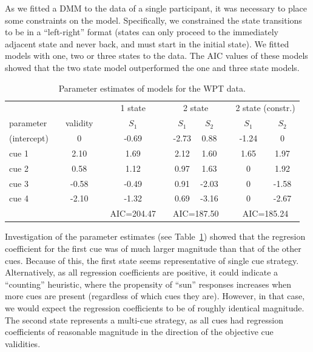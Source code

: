 \documentclass[a4paper,12pt,man]{apa} %
\begin{document}
As we fitted a DMM to the data of a single participant, it was
necessary to place some constraints on the model.  Specifically, we
constrained the state transitions to be in a ``left-right'' format
(states can only proceed to the immediately adjacent state and never
back, and must start in the initial state).  We fitted models with
one, two or three states to the data.  The AIC values of these models
showed that the two state model outperformed the one and three state
models.

\begin{table}
\caption{Parameter estimates of models for the WPT data.}
\label{tab:WPT}
\begin{tabular}{lcccccccccc} \hline
 & & \multicolumn{1}{c}{} && \multicolumn{1}{c}{1 state} & & \multicolumn{2}{c}{2 state} &&
 \multicolumn{2}{c}{2 state (constr.)} \\ \cline{5-5} \cline{7-8} \cline{10-11}
parameter && validity && $S_1$ & & $S_1$ & $S_2$ & & $S_1$ & $S_2$ \\ \hline
(intercept) && 0 && -0.69 & & -2.73 & 0.88 & & -1.24 & 0 \\
cue 1 && 2.10 && 1.69 && 2.12 & 1.60 && 1.65 & 1.97 \\
cue 2 && 0.58 && 1.12 && 0.97 & 1.63 && 0 & 1.92 \\
cue 3 && -0.58 && -0.49 && 0.91 & -2.03 && 0 & -1.58 \\
cue 4 && -2.10 && -1.32 && 0.69 & -3.16 && 0 & -2.67 \\ \hline
 & & & & \multicolumn{1}{c}{AIC=204.47} & & \multicolumn{2}{c}{AIC=187.50} &&
 \multicolumn{2}{c}{AIC=185.24}
\end{tabular}
\end{table}

Investigation of the parameter estimates (see Table~\ref{tab:WPT})
showed that the regresion coefficient for the first cue was of much
larger magnitude than that of the other cues.  Because of this, the
first state seems representative of single cue strategy.
Alternatively, as all regression coefficients are positive, it could
indicate a ``counting'' heuristic, where the propensity of ``sun''
responses increases when more cues are present (regardless of which
cues they are).  However, in that case, we would expect the regression
coefficients to be of roughly identical magnitude.  The second state
represents a multi-cue strategy, as all cues had regression
coefficients of reasonable magnitude in the direction of the objective
cue validities.
\end{document}
